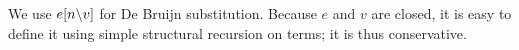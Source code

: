 We use $e[n \backslash v]$ for De Bruijn substitution. Because $e$ and $v$ are closed, it is easy to define it using simple structural recursion on terms; it is thus conservative.
\begin{comment}
Substitution is structurally recursive:
\begin{equation}
\begin{aligned}
	\pair{\tvar,m}[n \w e]&\ =\ 
		\begin{cases}
			e & \text{if } m = n \\
			\pair{\tvar,m} & \text{if } m \neq n
		\end{cases} \\
	\pair{\tfun,e_y}[n \w e]&\ =\ \pair{\tfun,e_y[s(n) \w e]} \\
	\pair{\tapp,e_f,e_x}[n \w e]&\ =\ \pair{\tapp,e_f[n \w e],e_x[n \w e]}
\end{aligned}
\end{equation}
Like the $\tapp$ case, the remaining cases simply distribute over subterms.
\end{comment}

\newcommand{\tpair}{\pair}

